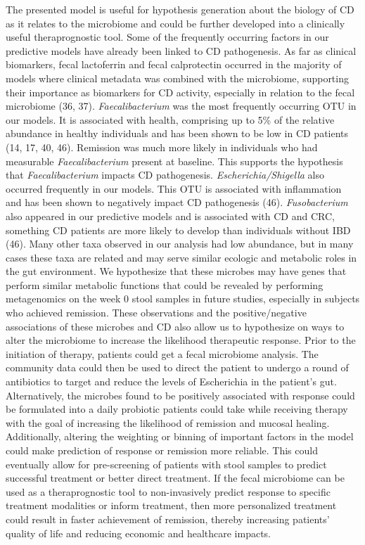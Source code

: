 \documentclass[11pt,]{article}
\begin{document}
The presented model is useful for hypothesis generation about the
biology of CD as it relates to the microbiome and could be further
developed into a clinically useful theraprognostic tool. Some of the
frequently occurring factors in our predictive models have already been
linked to CD pathogenesis. As far as clinical biomarkers, fecal
lactoferrin and fecal calprotectin occurred in the majority of models
where clinical metadata was combined with the microbiome, supporting
their importance as biomarkers for CD activity, especially in relation
to the fecal microbiome (36, 37). \emph{Faecalibacterium} was the most
frequently occurring OTU in our models. It is associated with health,
comprising up to 5\% of the relative abundance in healthy individuals
and has been shown to be low in CD patients (14, 17, 40, 46). Remission
was much more likely in individuals who had measurable
\emph{Faecalibacterium} present at baseline. This supports the
hypothesis that \emph{Faecalibacterium} impacts CD pathogenesis.
\emph{Escherichia/Shigella} also occurred frequently in our models. This
OTU is associated with inflammation and has been shown to negatively
impact CD pathogenesis (46). \emph{Fusobacterium} also appeared in our
predictive models and is associated with CD and CRC, something CD
patients are more likely to develop than individuals without IBD (46).
Many other taxa observed in our analysis had low abundance, but in many
cases these taxa are related and may serve similar ecologic and
metabolic roles in the gut environment. We hypothesize that these
microbes may have genes that perform similar metabolic functions that
could be revealed by performing metagenomics on the week 0 stool samples
in future studies, especially in subjects who achieved remission. These
observations and the positive/negative associations of these microbes
and CD also allow us to hypothesize on ways to alter the microbiome to
increase the likelihood therapeutic response. Prior to the initiation of
therapy, patients could get a fecal microbiome analysis. The community
data could then be used to direct the patient to undergo a round of
antibiotics to target and reduce the levels of Escherichia in the
patient's gut. Alternatively, the microbes found to be positively
associated with response could be formulated into a daily probiotic
patients could take while receiving therapy with the goal of increasing
the likelihood of remission and mucosal healing. Additionally, altering
the weighting or binning of important factors in the model could make
prediction of response or remission more reliable. This could eventually
allow for pre-screening of patients with stool samples to predict
successful treatment or better direct treatment. If the fecal microbiome
can be used as a theraprognostic tool to non-invasively predict response
to specific treatment modalities or inform treatment, then more
personalized treatment could result in faster achievement of remission,
thereby increasing patients' quality of life and reducing economic and
healthcare impacts.
\end{document}
